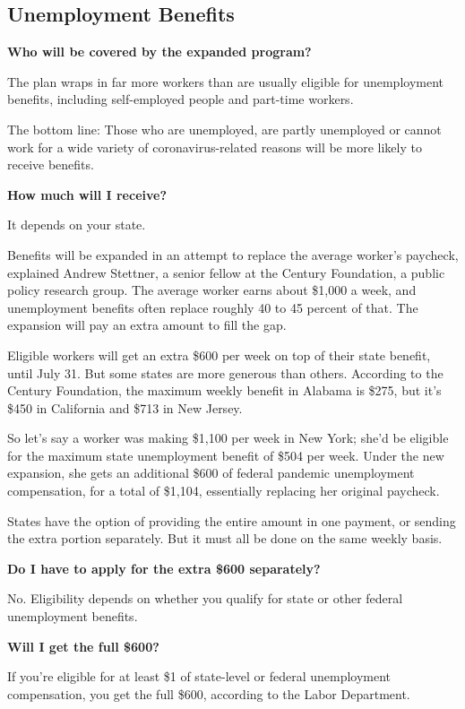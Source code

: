 \hypertarget{unemployment-benefits}{%
\subsection{Unemployment Benefits}\label{unemployment-benefits}}

\textbf{Who will be covered by the expanded program?}

The plan wraps in far more workers than are usually eligible for
unemployment benefits, including self-employed people and part-time
workers.

The bottom line: Those who are unemployed, are partly unemployed or
cannot work for a wide variety of coronavirus-related reasons will be
more likely to receive benefits.

\textbf{How much will I receive?}

It depends on your state.

Benefits will be expanded in an attempt to replace the average worker's
paycheck, explained Andrew Stettner, a senior fellow at the Century
Foundation, a public policy research group. The average worker earns
about \$1,000 a week, and unemployment benefits often replace roughly 40
to 45 percent of that. The expansion will pay an extra amount to fill
the gap.

Eligible workers will get an extra \$600 per week on top of their state
benefit, until July 31. But some states are more generous than others.
According to the Century Foundation, the maximum weekly benefit in
Alabama is \$275, but it's \$450 in California and \$713 in New Jersey.

So let's say a worker was making \$1,100 per week in New York; she'd be
eligible for the maximum state unemployment benefit of \$504 per week.
Under the new expansion, she gets an additional \$600 of federal
pandemic unemployment compensation, for a total of \$1,104, essentially
replacing her original paycheck.

States have the option of providing the entire amount in one payment, or
sending the extra portion separately. But it must all be done on the
same weekly basis.

\textbf{Do I have to apply for the extra \$600 separately?}

No. Eligibility depends on whether you qualify for state or other
federal unemployment benefits.

\textbf{Will I get the full \$600?}

If you're eligible for at least \$1 of state-level or federal
unemployment compensation, you get the full \$600, according to the
Labor Department.

